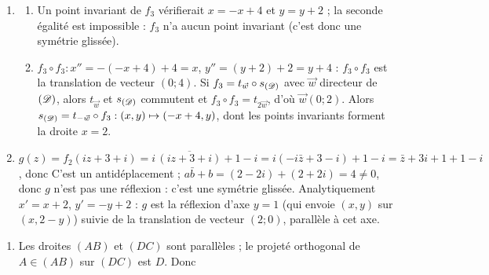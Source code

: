 \begin{corrige}
\begin{sol}
\begin{enumerate}
            $f_2$ : avec $a = i$, $b = 1 - i$, on a $a\bar{b} + b = i(1+i) + 1 - i = i - 1 + 1 - i = 0$ : $f_2$ est une réflexion.
            Ses points invariants vérifient $x = y + 1$ et $y = x - 1$ : 
      \item \begin{enumerate}
                  \item Un point invariant de $f_3$ vérifierait $x = -x + 4$ et $y = y + 2$ ; la seconde égalité est impossible :
                        $f_3$ n'a aucun point invariant (c'est donc une symétrie glissée).
                  \item $f_3 \circ f_3 : x'' = -(-x+4) + 4 = x$, $y'' = (y+2) + 2 = y + 4$ :
                        $f_3 \circ f_3$ est la translation de vecteur $(0;4)$.
                        Si $f_3 = t_{\vec{w}} \circ s_{(\mathscr{D})}$ avec $\vec{w}$ directeur de $(\mathscr{D})$, alors $t_{\vec{w}}$ et $s_{(\mathscr{D})}$ commutent et
                        $f_3 \circ f_3 = t_{2\vec{w}}$, d'où $\vec{w}(0;2)$.
                        Alors $s_{(\mathscr{D})} = t_{-\vec{w}} \circ f_3 : (x,y) \mapsto (-x + 4, y)$, dont les points invariants forment la droite
                        $x = 2$. 
            \end{enumerate}
      \item $g(z) = f_2(iz + 3 + i) = i\,\overline{(iz + 3 + i)} + 1 - i = i(-i\bar{z} + 3 - i) + 1 - i = \bar{z} + 3i + 1 + 1 - i$,
            donc 
            C'est un antidéplacement ; $a\bar{b} + b = (2 - 2i) + (2 + 2i) = 4 \neq 0$, donc $g$ n'est pas une réflexion : c'est une symétrie glissée.
            Analytiquement $x' = x + 2$, $y' = -y + 2$ : $g$ est la réflexion d'axe $y = 1$ (qui envoie $(x,y)$ sur $(x, 2-y)$)
            suivie de la translation de vecteur $(2;0)$, parallèle à cet axe.
\end{enumerate}
\end{sol}
\begin{sol}
\begin{enumerate}
      \item Les droites $(AB)$ et $(DC)$ sont parallèles ; le projeté orthogonal de $A \in (AB)$ sur $(DC)$ est $D$. Donc

\end{enumerate}
\end{sol}
\end{corrige}
